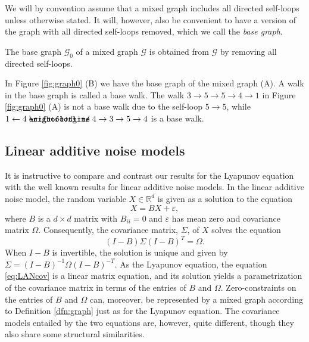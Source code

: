 \documentclass[10pt,twoside,a4paper]{amsart}
\DeclareRobustCommand{\unEdge}{%
	\mathrel{%
		\text{%
			\ooalign{$\rightfootline$\cr\reflectbox{$\rightfootline$}\cr}%
		}%
	}%
}
\begin{document}
We will by convention assume that a mixed graph includes all directed
self-loops unless otherwise stated. It will, however, also be convenient to have
a version of the graph with all directed self-loops removed, which we call the
\emph{base graph}.

\begin{definition}
    The base graph $\mathcal{G}_0$ of a mixed graph $\mathcal{G}$ is 
    obtained from $\mathcal{G}$ by removing all directed self-loops.
\end{definition}

In Figure \ref{fig:graph0} (B) we have the base graph of the mixed graph (A). A
walk in the base graph is called a base walk. The walk $3 \rightarrow 5
\rightarrow 5 \rightarrow 4 \rightarrow 1$ in Figure \ref{fig:graph0} (A) is not
a base walk due to the self-loop $5 \rightarrow 5$, while $1 \leftarrow 4
\unEdge 4  \rightarrow 3 \rightarrow 5 \rightarrow 4$ is a base walk.

\subsection{Linear additive noise models} It is instructive to compare and 
contrast our results for the Lyapunov equation with the well known results  
for linear additive noise models. In the linear additive noise model, the 
random variable $X \in \mathbb{R}^d$ is given as a solution to the equation
\begin{equation} \label{eq:LAN}
    X = B X + \varepsilon,
\end{equation}
where $B$ is a $d \times d$ matrix with $B_{ii} = 0$ and $\varepsilon$ has mean zero 
and covariance matrix $\Omega$. Consequently, the covariance matrix, 
$\Sigma$, of $X$ solves the equation 
\begin{equation} \label{eq:LANcov}
    (I - B) \Sigma (I - B)^T = \Omega.
\end{equation}
When $I - B$ is invertible, the solution is unique and given by $\Sigma =
(I - B)^{-1} \Omega (I - B)^{-T}$. As the Lyapunov equation, the
equation \eqref{eq:LANcov} is a linear matrix equation, and its solution yields a
parametrization of the covariance matrix in terms of the entries of $B$
and $\Omega$. Zero-constraints on the entries of $B$ and $\Omega$ can,
moreover, be represented by a mixed graph according to Definition
\ref{dfn:graph} just as for the Lyapunov equation. The covariance models 
entailed by the two equations are, however, quite different, though they 
also share some structural similarities.
\end{document}
